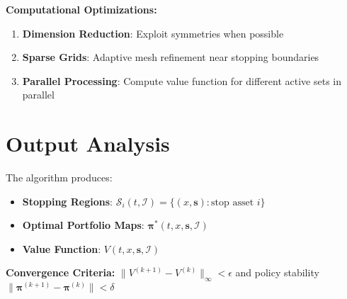 \documentclass[11pt]{article}
\begin{document}
\textbf{Computational Optimizations:}
\begin{enumerate}
\item \textbf{Dimension Reduction}: Exploit symmetries when possible
\item \textbf{Sparse Grids}: Adaptive mesh refinement near stopping boundaries
\item \textbf{Parallel Processing}: Compute value function for different active sets in parallel
\end{enumerate}

\section{Output Analysis}

The algorithm produces:
\begin{itemize}
\item \textbf{Stopping Regions}: $\mathcal{S}_i(t, \mathcal{I}) = \{(x, \mathbf{s}): \text{stop asset } i\}$
\item \textbf{Optimal Portfolio Maps}: $\boldsymbol{\pi}^*(t, x, \mathbf{s}, \mathcal{I})$
\item \textbf{Value Function}: $V(t, x, \mathbf{s}, \mathcal{I})$
\end{itemize}

\textbf{Convergence Criteria:}
$\|V^{(k+1)} - V^{(k)}\|_\infty < \epsilon$ and policy stability $\|\boldsymbol{\pi}^{(k+1)} - \boldsymbol{\pi}^{(k)}\| < \delta$
\end{document}
